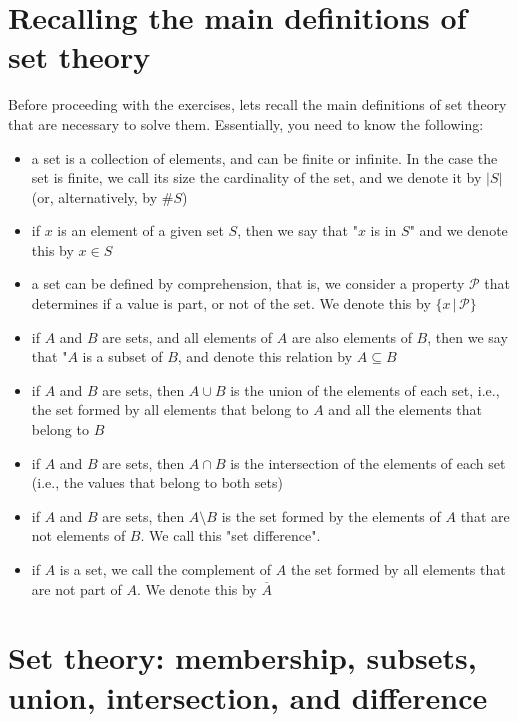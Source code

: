 \documentclass[11pt]{article}
\newcommand{\myset}[1]{\{#1\}}
\begin{document}
\section*{Recalling the main definitions of set theory}
Before proceeding with the exercises, lets recall the main definitions of set theory that are necessary to solve them. Essentially, you need to know the following:
\begin{itemize}
  
  \item a set is a collection of elements, and can be finite or infinite. In the case the set is finite, we call its size the cardinality of the set, and we denote it by $|S|$ (or, alternatively, by $\#S$)
  
  \item if $x$ is an element of a given set $S$, then we say that "$x$ is in $S$" and we denote this by $x \in S$
  
  \item a set can be defined by comprehension, that is, we consider a property $\mathcal{P}$ that determines if a value is part, or not of the set. We denote this by $\myset{x\,|\,\mathcal{P}}$
  
  \item if $A$ and $B$ are sets, and all elements of $A$ are also elements of $B$, then we say that "$A$ is a subset of $B$, and denote this relation by $A \subseteq B$
  
  \item if $A$ and $B$ are sets, then $A \cup B$ is the union of the elements of each set, i.e., the set formed by all elements that belong to $A$ and all the elements that belong to $B$
  
  \item if $A$ and $B$ are sets, then $A \cap B$ is the intersection of the elements of each set (i.e., the values that belong to both sets)
  
  \item if $A$ and $B$ are sets, then $A \setminus B$ is the set formed by the elements of $A$ that are not elements of $B$. We call this "set difference".

  \item if $A$ is a set, we call the complement of $A$ the set formed by all elements that are not part of $A$. We denote this by $\overline{A}$
\end{itemize}

\section*{Set theory: membership, subsets, union, intersection, and difference}
\end{document}
